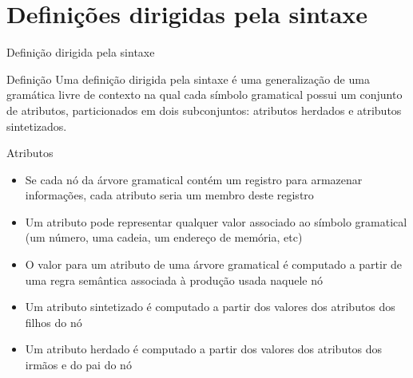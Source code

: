 \section{Definições dirigidas pela sintaxe}

\begin{frame}[fragile]{Definição dirigida pela sintaxe}

    \begin{block}{Definição}
        Uma definição dirigida pela sintaxe é uma generalização de uma gramática livre de contexto na qual cada símbolo gramatical
        possui um conjunto de atributos, particionados em dois subconjuntos: atributos herdados e atributos sintetizados.
    \end{block}

\end{frame}

\begin{frame}[fragile]{Atributos}

    \begin{itemize}
        \item Se cada nó da árvore gramatical contém um registro para armazenar informações, cada atributo seria um membro deste
            registro
        \pause

        \item Um atributo pode representar qualquer valor associado ao símbolo gramatical (um número, uma cadeia, um endereço de memória,
            etc)
        \pause

        \item O valor para um atributo de uma árvore gramatical é computado a partir de uma regra semântica associada à produção usada
            naquele nó
        \pause

        \item Um atributo sintetizado é computado a partir dos valores dos atributos dos filhos do nó
        \pause

        \item Um atributo herdado é computado a partir dos valores dos atributos dos irmãos e do pai do nó
    \end{itemize}

\end{frame}

